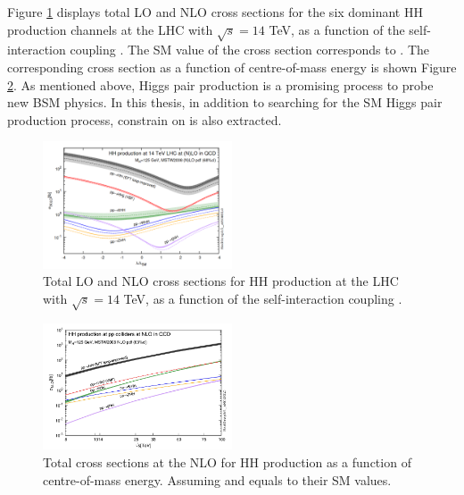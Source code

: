 Figure \ref{fig:chap1:HH:BSM:XSEC:L} displays total LO and NLO cross sections for the six dominant HH production channels at the LHC with $\sqrt{s}=14$ TeV, as a function of the self-interaction coupling \kl. The SM value of the cross section corresponds to . The corresponding cross section as a function of centre-of-mass energy is shown Figure \ref{fig:chap1:HH:BSM:XSEC:S}. As mentioned above, Higgs pair production is a promising process to probe new BSM physics. In this thesis, in addition to searching for the SM Higgs pair production process, constrain on \kl is also extracted.
\begin{figure}[H]
    \centering
    \includegraphics[width=0.5\textwidth]{Ch1/Img/HH_Xsec_as_lambda.png}
    \caption{Total LO and NLO cross sections for HH production at the LHC with $\sqrt{s}=14$ TeV, as a function of the self-interaction coupling \kl.}
    \label{fig:chap1:HH:BSM:XSEC:L}
\end{figure}
\begin{figure}[H]
    \centering
    \includegraphics[width=0.5\textwidth]{Ch1/Img/HH_XSec_as_S.png}
    \caption{Total cross sections at the NLO for HH production as a function of centre-of-mass energy. Assuming \kl and \kt equals to their SM values.}
    \label{fig:chap1:HH:BSM:XSEC:S}
\end{figure}
